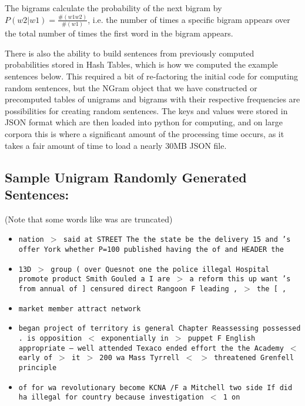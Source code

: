 \documentclass[12pt]{article}
\begin{document}
The bigrams calculate the probability of the next bigram by $P(w2|w1) = \frac{\#(w1 w2)}{\#(w1)}$, i.e. the number of times a specific bigram appears over the total number of times the first word in the bigram appears. 

There is also the ability to build sentences from previously computed probabilities stored in Hash Tables, which is how we computed the example sentences below. This required a bit of re-factoring the initial code for computing random sentences, but the NGram object that we have constructed or precomputed tables of unigrams and bigrams with their respective frequencies are possibilities for creating random sentences. The keys and values were stored in JSON format which are then loaded into python for computing, and on large corpora this is where a significant amount of the processing time occurs, as it takes a fair amount of time to load a nearly 30MB JSON file. 

\subsection{Sample Unigram Randomly Generated Sentences:}
(Note that some words like was are truncated)

\begin{itemize}
\item \texttt{nation $>$ said at STREET The the state be the delivery 15 and 's offer York whether P=100 published having the of and HEADER the}

\item \texttt{13D $>$ group ( over Quesnot one the police illegal Hospital promote product Smith  Gouled a I are $>$ a reform this up want 's from annual of ] censured direct Rangoon F leading , $>$ the [ ,}

\item \texttt{market member attract network}

\item \texttt{began project of territory is general Chapter Reassessing possessed . is opposition $<$ exponentially in $>$ puppet F English appropriate -- well attended Texaco ended effort the the Academy $<$ early of $>$ it $>$ 200 wa Mass Tyrrell $<$ $>$ threatened Grenfell principle}

\item \texttt{of for wa revolutionary become KCNA /F a Mitchell two side If did ha illegal for country because investigation $<$ 1 on}
\end{itemize}
\end{document}
